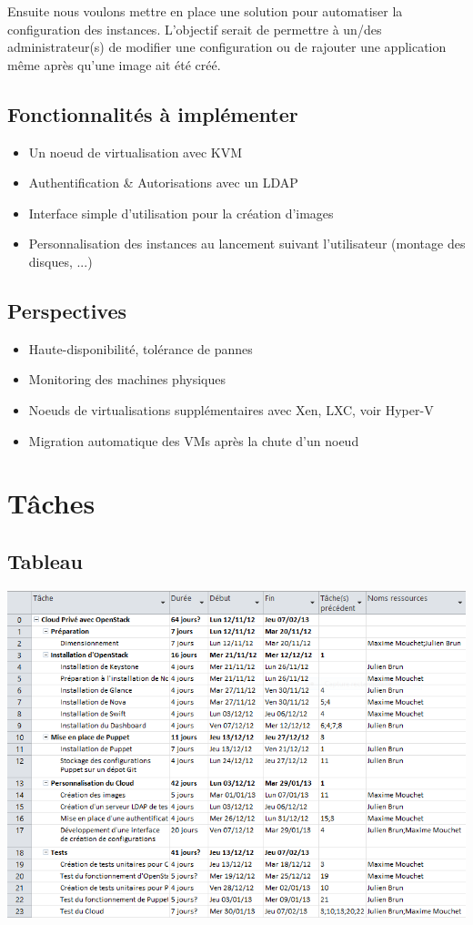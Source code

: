 \documentclass{report}
\begin{document}
Ensuite nous voulons mettre en place une solution pour automatiser la configuration des instances. L'objectif serait de permettre à un/des administrateur(s) de modifier une configuration ou de rajouter une application même après qu'une image ait été créé.

\section{Fonctionnalités à implémenter}
\begin{itemize}
\item Un noeud de virtualisation avec KVM
\item Authentification \& Autorisations avec un LDAP
\item Interface simple d'utilisation pour la création d'images
\item Personnalisation des instances au lancement suivant l'utilisateur (montage des disques, ...)
\end{itemize}

\section{Perspectives}
\begin{itemize}
\item Haute-disponibilité, tolérance de pannes
\item Monitoring des machines physiques
\item Noeuds de virtualisations supplémentaires avec Xen, LXC, voir Hyper-V
\item Migration automatique des VMs après la chute d'un noeud
\end{itemize}
\chapter{Tâches}
\section{Tableau}
\includegraphics[width=19cm,angle=90]{images/liste.png}
\end{document}
